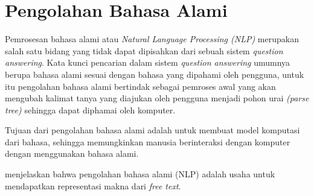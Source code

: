 \section{Pengolahan Bahasa Alami}
Pemrosesan bahasa alami atau \emph{Natural Language Processing (NLP)} merupakan salah satu bidang yang tidak dapat dipisahkan dari sebuah sistem \emph{question answering}. Kata kunci pencarian dalam sistem \emph{question answering} umumnya berupa bahasa alami sesuai dengan bahasa yang dipahami oleh pengguna, untuk itu pengolahan bahasa alami bertindak sebagai pemroses awal yang akan mengubah kalimat tanya yang diajukan oleh pengguna menjadi pohon urai \emph{(parse tree)} sehingga dapat diphamai oleh komputer.

Tujuan dari pengolahan bahasa alami adalah untuk membuat model komputasi dari bahasa, sehingga memungkinkan manusia berinteraksi dengan komputer dengan menggunakan bahasa alami.

\citet*{kao_potet} menjelaskan bahwa pengolahan bahasa alami (NLP) adalah usaha untuk mendapatkan representasi makna dari \emph{free text}.

